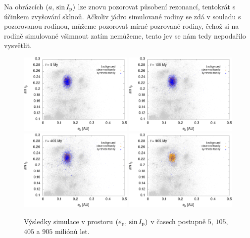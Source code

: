 \documentclass[A4paper, 12pt, oneside]{book}
\begin{document}
Na obrázcích $(a,\,\sin I_{\rm p})$ lze znovu pozorovat působení rezonancí, tentokrát s účinkem zvyšování sklnoů. Ačkoliv jádro simulované rodiny se zdá v souladu s pozorovanou rodinou, můžeme pozorovat mírné  pozrované rodiny, čehož si na rodině simulované všimnout zatím nemůžeme, tento jev se nám tedy nepodařilo vysvětlit.

\immediate{}
\immediate{}
\immediate{}
\immediate{}
\begin{figure}
	\centering
	\includegraphics[width=0.49\textwidth]{obr/ei_5t.png}
	\includegraphics[width=0.49\textwidth]{obr/ei_105t.png}\\
	\includegraphics[width=0.49\textwidth]{obr/ei_405t.png}
	\includegraphics[width=0.49\textwidth]{obr/ei_905t.png}
	\caption{Výsledky simulace v prostoru $(e_{\rm p},\,\sin I_{\rm p})$ v časech postupně $5$, $105$, $405$ a $905$ miliónů let.} \label{fig:ei_sim}
\end{figure}
\end{document}
